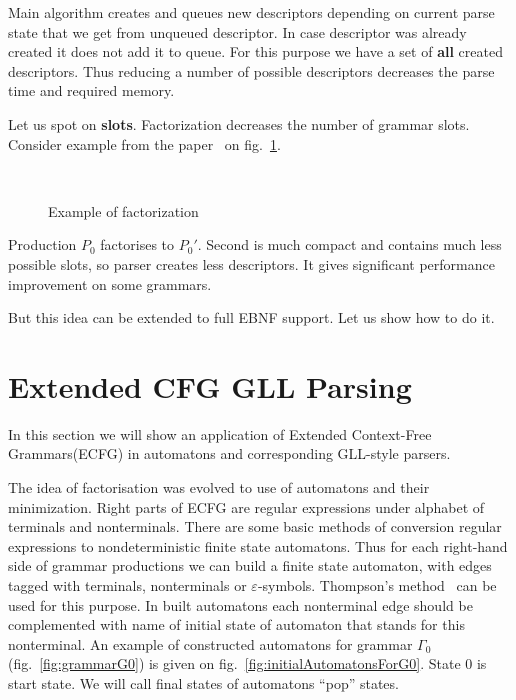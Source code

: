 \documentclass[runningheads,a4paper]{llncs}
\begin{document}
Main algorithm creates and queues new descriptors depending on current parse state that we get from unqueued descriptor. 
In case descriptor was already created it does not add it to queue. For this purpose we have a set of
\textbf{all} created descriptors. Thus reducing a number of possible descriptors decreases the parse time
and required memory.

Let us spot on \textbf{slots}. Factorization decreases the number of grammar slots. 
Consider example from the paper~\cite{scott2016structuring} on fig.~\ref{fig:ExampleOfFactorization}.

\begin{figure}
    \centering
    ~
    \caption{Example of factorization}
    \label{fig:ExampleOfFactorization}
\end{figure}
Production $P_0$ factorises to $P_0'$.
Second is much compact and contains much less possible slots, 
so parser creates less descriptors.
It gives significant performance improvement on some grammars.

But this idea can be extended to full EBNF support.
Let us show how to do it.


\section{Extended CFG GLL Parsing}%

In this section we will show an application of Extended Context-Free Grammars(ECFG) in automatons and corresponding GLL-style parsers.

The idea of factorisation was evolved to use of automatons and their minimization.
Right parts of ECFG are regular expressions under alphabet of terminals and nonterminals.
There are some basic methods of conversion regular expressions to nondeterministic finite state automatons. 
Thus for each right-hand side of grammar productions we can build a finite state automaton, with edges tagged with 
terminals, nonterminals or $\varepsilon$-symbols. Thompson's method~\cite{Thompson:1968:PTR:363347.363387} can be used for this purpose. 
In built automatons each nonterminal edge should be complemented with name of initial state of automaton that stands 
for this nonterminal. An example of constructed automatons for grammar $\Gamma_{0}$(fig.~\ref{fig:grammarG0}) is given on fig.~\ref{fig:initialAutomatonsForG0}. State 0 is start state.
We will call final states of automatons ``pop'' states.
\end{document}
